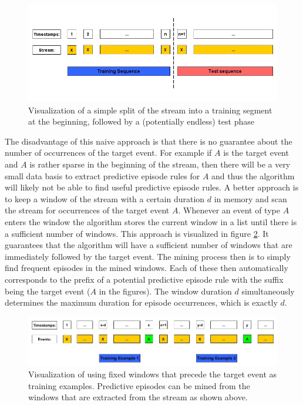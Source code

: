 \begin{figure}[h]
	\centering
  	\includegraphics[width=\textwidth]{trainingDataNaive}
	\caption[Training Data Selection: Naive Approach 1]{Visualization of a simple split of the stream into a training segment at the beginning, followed by a (potentially endless) test phase}
	\label{fig_trainingDataNaive}
\end{figure}

The disadvantage of this naive approach is that there is no guarantee about the number of occurrences of the target event. For example if $A$ is the target event and $A$ is rather sparse in the beginning of the stream, then there will be a very small data basis to extract predictive episode rules for $A$ and thus the algorithm will likely not be able to find useful predictive episode rules. 
A better approach is to keep a window of the stream with a certain duration $d$ in memory and scan the stream for occurrences of the target event $A$. Whenever an event of type $A$ enters the window the algorithm stores the current window in a list until there is a sufficient number of windows. This approach is visualized in figure \ref{fig_trainingDataWindowsOfA}. It guarantees that the algorithm will have a sufficient number of windows that are immediately followed by the target event. The mining process then is to simply find frequent episodes in the mined windows. Each of these then automatically corresponds to the prefix of a potential predictive episode rule with the suffix being the target event ($A$ in the figures). The window duration $d$ simultaneously determines the maximum duration for episode occurrences, which is exactly $d$.

\begin{figure}[h]
	\centering
  	\includegraphics[width=\textwidth]{trainingDataWindowsOfA}
	\caption[Training Data Selection: Naive Approach 2]{Visualization of using fixed windows that precede the target event as training examples. Predictive episodes can be mined from the windows that are extracted from the stream as shown above.}
	\label{fig_trainingDataWindowsOfA}
\end{figure}


